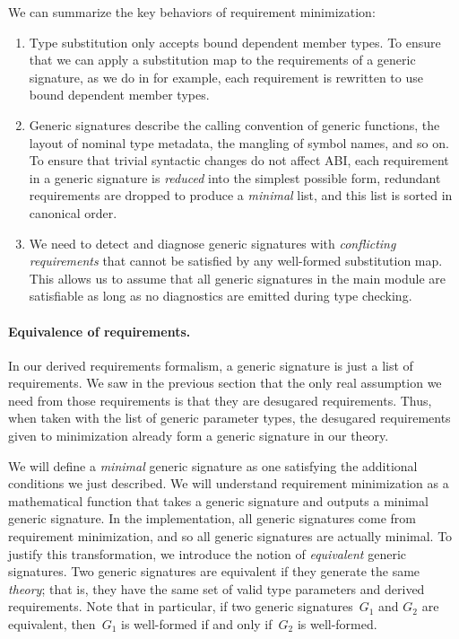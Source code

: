\documentclass[../generics]{subfiles}
\begin{document}
We can summarize the key behaviors of requirement minimization:
\begin{enumerate}
\item
Type substitution only accepts bound dependent member types. To ensure that we can apply a substitution map to the requirements of a generic signature, as we do in  for example, each requirement is rewritten to use bound dependent member types.

\item Generic signatures describe the calling convention of generic functions, the layout of nominal type metadata, the mangling of symbol names, and so on. To ensure that trivial syntactic changes do not affect ABI, each requirement in a generic signature is \emph{reduced} into the simplest possible form, redundant requirements are dropped to produce a \emph{minimal} list, and this list is sorted in canonical order.

\item We need to detect and diagnose generic signatures with \emph{conflicting requirements} that cannot be satisfied by any well-formed substitution map. This allows us to assume that all generic signatures in the main module are satisfiable as long as no diagnostics are emitted during type checking.
\end{enumerate}

\paragraph{Equivalence of requirements.} In our derived requirements formalism, a generic signature is just a list of requirements. We saw in the previous section that the only real assumption we need from those requirements is that they are desugared requirements. Thus, when taken with the list of generic parameter types, the desugared requirements given to minimization already form a generic signature in our theory.

We will define a \emph{minimal} generic signature as one satisfying the additional conditions we just described. We will understand requirement minimization as a mathematical function that takes a generic signature and outputs a minimal generic signature. In the implementation, all generic signatures come from requirement minimization, and so all generic signatures are actually minimal. To justify this transformation, we introduce the notion of \emph{equivalent} generic signatures. Two generic signatures are equivalent if they generate the same \emph{theory}; that is, they have the same set of valid type parameters and derived requirements. Note that in particular, if two generic signatures~$G_1$ and $G_2$ are equivalent, then~$G_1$ is well-formed if and only if~$G_2$ is well-formed.
\end{document}
